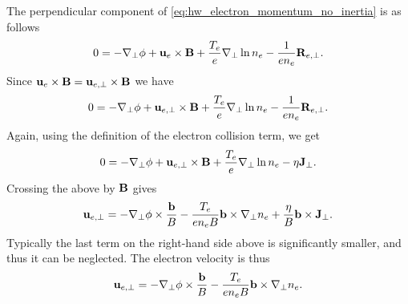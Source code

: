\documentclass[11pt]{article}
\begin{document}
The perpendicular component of \cref{eq:hw_electron_momentum_no_inertia} is as follows
\begin{equation}
    0 = -\nabla_\perp \phi + \mathbf{u}_e \times \mathbf{B} + \frac{T_e}{e} \nabla_\perp \ln n_e - \frac{1}{e n_e}\mathbf{R}_{e,\perp}.
\end{equation}
Since $\mathbf{u}_e \times \mathbf{B} = \mathbf{u}_{e,\perp} \times \mathbf{B}$ we have
\begin{equation}
    0 = -\nabla_\perp \phi + \mathbf{u}_{e,\perp} \times \mathbf{B} + \frac{T_e}{e} \nabla_\perp \ln n_e - \frac{1}{e n_e}\mathbf{R}_{e,\perp}.
\end{equation}
Again, using the definition of the electron collision term, we get
\begin{equation}
    0 = -\nabla_\perp \phi + \mathbf{u}_{e,\perp} \times \mathbf{B} + \frac{T_e}{e} \nabla_\perp \ln n_e - \eta \mathbf{J}_\perp.
\end{equation}
Crossing the above by $\mathbf{B}$ gives 
\begin{equation}
    \mathbf{u}_{e,\perp} = -\nabla_\perp \phi \times \frac{\mathbf{b}}{B} - \frac{T_e}{e n_e B} {\mathbf{b} \times \nabla_\perp n_e} + \frac{\eta}{B} \mathbf{b} \times \mathbf{J}_\perp.
\end{equation}
Typically the last term on the right-hand side above is significantly smaller, and thus it can be neglected. The electron velocity is thus
\begin{equation}
    \label{eq:hw_elec_vel}
    \mathbf{u}_{e,\perp} = -\nabla_\perp \phi \times \frac{\mathbf{b}}{B} - \frac{T_e}{e n_e B} {\mathbf{b} \times \nabla_\perp n_e}.
\end{equation}
\end{document}
